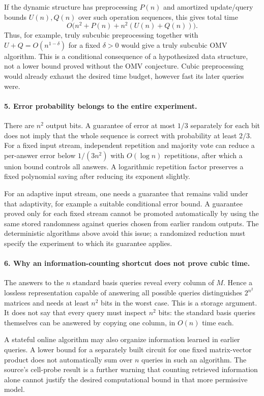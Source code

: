 \documentclass[11pt]{article}
\begin{document}
If the dynamic structure has preprocessing $P(n)$ and amortized update/query bounds $U(n),Q(n)$ over such operation sequences, this gives total time
\[
 O\bigl(n^2+P(n)+n^2(U(n)+Q(n))\bigr).
\]
Thus, for example, truly subcubic preprocessing together with $U+Q=O(n^{1-\delta})$ for a fixed $\delta>0$ would give a truly subcubic OMV algorithm. This is a conditional consequence of a hypothesized data structure, not a lower bound proved without the OMV conjecture. Cubic preprocessing would already exhaust the desired time budget, however fast its later queries were.

\paragraph{5. Error probability belongs to the entire experiment.}
There are $n^2$ output bits. A guarantee of error at most $1/3$ separately for each bit does not imply that the whole sequence is correct with probability at least $2/3$. For a fixed input stream, independent repetition and majority vote can reduce a per-answer error below $1/(3n^2)$ with $O(\log n)$ repetitions, after which a union bound controls all answers. A logarithmic repetition factor preserves a fixed polynomial saving after reducing its exponent slightly.

For an adaptive input stream, one needs a guarantee that remains valid under that adaptivity, for example a suitable conditional error bound. A guarantee proved only for each fixed stream cannot be promoted automatically by using the same stored randomness against queries chosen from earlier random outputs. The deterministic algorithms above avoid this issue; a randomized reduction must specify the experiment to which its guarantee applies.

\paragraph{6. Why an information-counting shortcut does not prove cubic time.}
The answers to the $n$ standard basis queries reveal every column of $M$. Hence a lossless representation capable of answering all possible queries distinguishes $2^{n^2}$ matrices and needs at least $n^2$ bits in the worst case. This is a storage argument. It does not say that every query must inspect $n^2$ bits: the standard basis queries themselves can be answered by copying one column, in $O(n)$ time each.

A stateful online algorithm may also organize information learned in earlier queries. A lower bound for a separately built circuit for one fixed matrix-vector product does not automatically sum over $n$ queries in such an algorithm. The source's cell-probe result is a further warning that counting retrieved information alone cannot justify the desired computational bound in that more permissive model.
\end{document}
